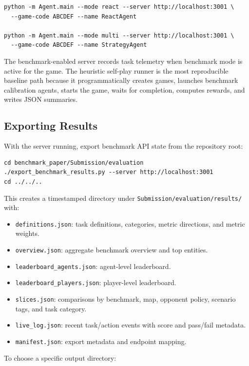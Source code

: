 \documentclass{article}
\begin{document}
\begin{verbatim}
python -m Agent.main --mode react --server http://localhost:3001 \
  --game-code ABCDEF --name ReactAgent

python -m Agent.main --mode multi --server http://localhost:3001 \
  --game-code ABCDEF --name StrategyAgent
\end{verbatim}

The benchmark-enabled server records task telemetry when benchmark mode is active for the game. The heuristic self-play runner is the most reproducible baseline path because it programmatically creates games, launches benchmark calibration agents, starts the game, waits for completion, computes rewards, and writes JSON summaries.

\subsection{Exporting Results}

With the server running, export benchmark API state from the repository root:

\begin{verbatim}
cd benchmark_paper/Submission/evaluation
./export_benchmark_results.py --server http://localhost:3001
cd ../../..
\end{verbatim}

This creates a timestamped directory under \texttt{Submission/evaluation/results/} with:
\begin{itemize}
    \item \texttt{definitions.json}: task definitions, categories, metric directions, and metric weights.
    \item \texttt{overview.json}: aggregate benchmark overview and top entities.
    \item \texttt{leaderboard\_agents.json}: agent-level leaderboard.
    \item \texttt{leaderboard\_players.json}: player-level leaderboard.
    \item \texttt{slices.json}: comparisons by benchmark, map, opponent policy, scenario tags, and task category.
    \item \texttt{live\_log.json}: recent task/action events with score and pass/fail metadata.
    \item \texttt{manifest.json}: export metadata and endpoint mapping.
\end{itemize}

To choose a specific output directory:
\end{document}
